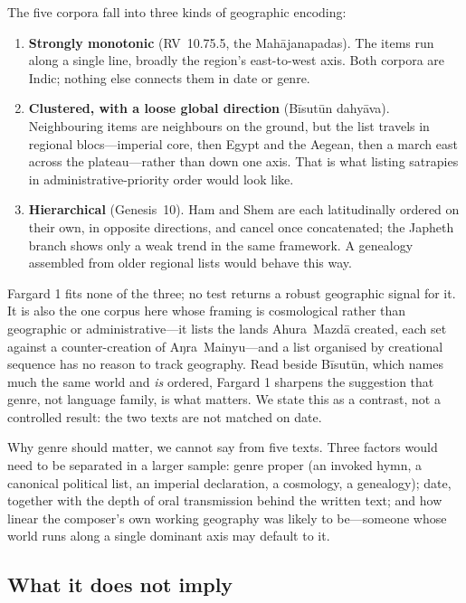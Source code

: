 \documentclass[11pt]{article}
\begin{document}
The five corpora fall into three kinds of geographic encoding:

\begin{enumerate}
\item \textbf{Strongly monotonic} (RV~10.75.5, the Mahājanapadas).
      The items run along a single line, broadly the region's
      east-to-west axis. Both corpora are Indic; nothing else
      connects them in date or genre.
\item \textbf{Clustered, with a loose global direction}
      (Bīsutūn dahyāva). Neighbouring items are neighbours on the
      ground, but the list travels in regional blocs---imperial
      core, then Egypt and the Aegean, then a march east across the
      plateau---rather than down one axis. That is what listing
      satrapies in administrative-priority order would look like.
\item \textbf{Hierarchical} (Genesis~10). Ham and Shem are each
      latitudinally ordered on their own, in opposite directions,
      and cancel once concatenated; the Japheth branch shows only a
      weak trend in the same framework. A genealogy assembled from
      older regional lists would behave this way.
\end{enumerate}

Fargard 1 fits none of the three; no test returns a robust
geographic signal for it.
It is also the one corpus here whose framing is cosmological rather
than geographic or administrative---it lists the lands Ahura~Mazdā
created, each set against a counter-creation of Aŋra~Mainyu---and a
list organised by creational sequence has no reason to track
geography. Read beside Bīsutūn, which names much the same world and
\emph{is} ordered, Fargard 1 sharpens the suggestion that genre,
not language family, is what matters. We state this as a contrast,
not a controlled result: the two texts are not matched on date.

Why genre should matter, we cannot say from five texts. Three
factors would need to be separated in a larger sample: genre proper
(an invoked hymn, a canonical political list, an imperial
declaration, a cosmology, a genealogy); date, together with the
depth of oral transmission behind the written text; and how linear
the composer's own working geography was likely to be---someone
whose world runs along a single dominant axis may default to it.

\subsection{What it does not imply}\label{sec:nogo}
\end{document}
